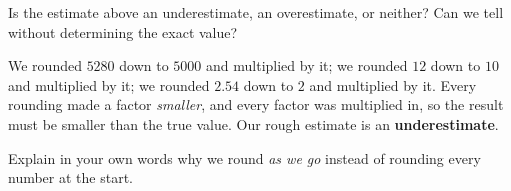 \documentclass[12pt]{ximera}
\begin{document}
\begin{problem}
Is the estimate above an underestimate, an overestimate, or neither? Can we tell
without determining the exact value?

\begin{multipleChoice}
\end{multipleChoice}

\begin{solution}
We rounded $5280$ down to $5000$ and multiplied by it; we rounded $12$ down to $10$
and multiplied by it; we rounded $2.54$ down to $2$ and multiplied by it. Every
rounding made a factor \emph{smaller}, and every factor was multiplied in, so the
result must be smaller than the true value. Our rough estimate is an
\textbf{underestimate}.
\end{solution}
\end{problem}

\begin{problem}
Explain in your own words why we round \emph{as we go} instead of rounding every
number at the start.

\begin{freeResponse}
\end{freeResponse}
\end{problem}
\end{document}
